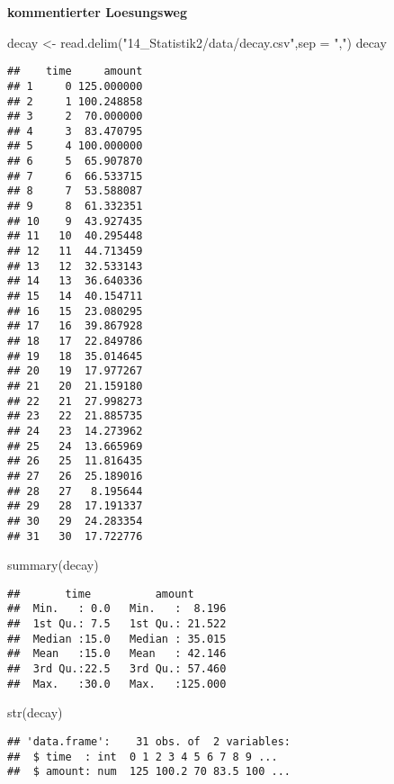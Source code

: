\documentclass[
]{article}
\newenvironment{Shaded}{\begin{snugshade}}{\end{snugshade}}
\newcommand{\AttributeTok}[1]{\textcolor[rgb]{0.77,0.63,0.00}{#1}}
\newcommand{\FunctionTok}[1]{\textcolor[rgb]{0.00,0.00,0.00}{#1}}
\newcommand{\NormalTok}[1]{#1}
\newcommand{\OtherTok}[1]{\textcolor[rgb]{0.56,0.35,0.01}{#1}}
\newcommand{\StringTok}[1]{\textcolor[rgb]{0.31,0.60,0.02}{#1}}
\begin{document}
\textbf{kommentierter Loesungsweg}

\begin{Shaded}
\begin{Highlighting}[]
\NormalTok{decay }\OtherTok{\textless{}{-}} \FunctionTok{read.delim}\NormalTok{(}\StringTok{"14\_Statistik2/data/decay.csv"}\NormalTok{,}\AttributeTok{sep =} \StringTok{","}\NormalTok{)}
\NormalTok{decay}
\end{Highlighting}
\end{Shaded}

\begin{verbatim}
##    time     amount
## 1     0 125.000000
## 2     1 100.248858
## 3     2  70.000000
## 4     3  83.470795
## 5     4 100.000000
## 6     5  65.907870
## 7     6  66.533715
## 8     7  53.588087
## 9     8  61.332351
## 10    9  43.927435
## 11   10  40.295448
## 12   11  44.713459
## 13   12  32.533143
## 14   13  36.640336
## 15   14  40.154711
## 16   15  23.080295
## 17   16  39.867928
## 18   17  22.849786
## 19   18  35.014645
## 20   19  17.977267
## 21   20  21.159180
## 22   21  27.998273
## 23   22  21.885735
## 24   23  14.273962
## 25   24  13.665969
## 26   25  11.816435
## 27   26  25.189016
## 28   27   8.195644
## 29   28  17.191337
## 30   29  24.283354
## 31   30  17.722776
\end{verbatim}

\begin{Shaded}
\begin{Highlighting}[]
\FunctionTok{summary}\NormalTok{(decay)}
\end{Highlighting}
\end{Shaded}

\begin{verbatim}
##       time          amount       
##  Min.   : 0.0   Min.   :  8.196  
##  1st Qu.: 7.5   1st Qu.: 21.522  
##  Median :15.0   Median : 35.015  
##  Mean   :15.0   Mean   : 42.146  
##  3rd Qu.:22.5   3rd Qu.: 57.460  
##  Max.   :30.0   Max.   :125.000
\end{verbatim}

\begin{Shaded}
\begin{Highlighting}[]
\FunctionTok{str}\NormalTok{(decay)}
\end{Highlighting}
\end{Shaded}

\begin{verbatim}
## 'data.frame':    31 obs. of  2 variables:
##  $ time  : int  0 1 2 3 4 5 6 7 8 9 ...
##  $ amount: num  125 100.2 70 83.5 100 ...
\end{verbatim}
\end{document}
